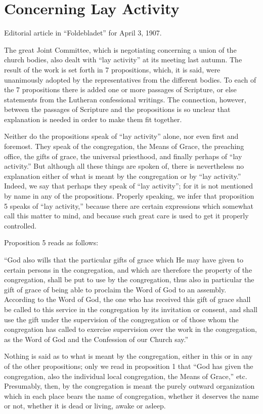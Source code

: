 
\section{Concerning Lay Activity}

Editorial article in “Foldebladet” for April 3, 1907.

The great Joint Committee, which is negotiating concerning a union of the church bodies, also dealt with “lay activity” at its meeting last autumn. The result of the work is set forth in 7 propositions, which, it is said, were unanimously adopted by the representatives from the different bodies. To each of the 7 propositions there is added one or more passages of Scripture, or else statements from the Lutheran confessional writings. The connection, however, between the passages of Scripture and the propositions is so unclear that explanation is needed in order to make them fit together.

Neither do the propositions speak of “lay activity” alone, nor even first and foremost. They speak of the congregation, the Means of Grace, the preaching office, the gifts of grace, the universal priesthood, and finally perhaps of “lay activity.” But although all these things are spoken of, there is nevertheless no explanation either of what is meant by the congregation or by “lay activity.” Indeed, we say that perhaps they speak of “lay activity”; for it is not mentioned by name in any of the propositions. Properly speaking, we infer that proposition 5 speaks of “lay activity,” because there are certain expressions which somewhat call this matter to mind, and because such great care is used to get it properly controlled.

Proposition 5 reads as follows:

“God also wills that the particular gifts of grace which He may have given to certain persons in the congregation, and which are therefore the property of the congregation, shall be put to use by the congregation, thus also in particular the gift of grace of being able to proclaim the Word of God to an assembly. According to the Word of God, the one who has received this gift of grace shall be called to this service in the congregation by its invitation or consent, and shall use the gift under the supervision of the congregation or of those whom the congregation has called to exercise supervision over the work in the congregation, as the Word of God and the Confession of our Church say.”

Nothing is said as to what is meant by the congregation, either in this or in any of the other propositions; only we read in proposition 1 that “God has given the congregation, also the individual local congregation, the Means of Grace,” etc. Presumably, then, by the congregation is meant the purely outward organization which in each place bears the name of congregation, whether it deserves the name or not, whether it is dead or living, awake or asleep.

